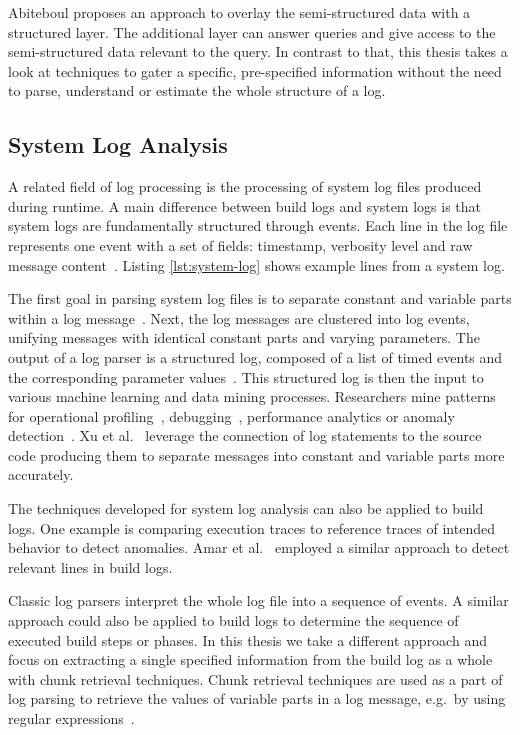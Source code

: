 \documentclass[\myrootdir/main.tex]{subfiles}
\begin{document}
Abiteboul proposes an approach to overlay the semi-structured data with a structured layer.
The additional layer can answer queries and give access to the semi-structured data relevant to the query.
In contrast to that, this thesis takes a look at techniques to gater a specific, pre-specified information without the need to parse, understand or estimate the whole structure of a log.

\subsection{System Log Analysis}
\label{sec:log-analysis}
A related field of log processing is the processing of system log files produced during runtime.
A main difference between build logs and system logs is that system logs are fundamentally structured through events.
Each line in the log file represents one event with a set of fields: timestamp, verbosity level and raw message content~\cite{he2017towards}.
Listing \ref{lst:system-log} shows example lines from a system log.

The first goal in parsing system log files is to separate constant and variable parts within a log message~\cite{nagappan2010abstracting,he2017towards}.
Next, the log messages are clustered into log events, unifying messages with identical constant parts and varying parameters.
The output of a log parser is a structured log, composed of a list of timed events and the corresponding parameter values~\cite{he2016evaluation}.
This structured log is then the input to various machine learning and data mining processes.
Researchers mine patterns for operational profiling~\cite{nagappan2009efficiently}, debugging~\cite{oliner2012advances}, performance analytics or anomaly detection~\cite{nagappan2010abstracting}.
Xu et al.~\cite{xu2009detecting} leverage the connection of log statements to the source code producing them to separate messages into constant and variable parts more accurately.

The techniques developed for system log analysis can also be applied to build logs.
One example is comparing execution traces to reference traces of intended behavior to detect anomalies.
Amar et al.~\cite{amar2019mining} employed a similar approach to detect relevant lines in build logs.

Classic log parsers interpret the whole log file into a sequence of events.
A similar approach could also be applied to build logs to determine the sequence of executed build steps or phases.
In this thesis we take a different approach and focus on extracting a single specified information from the build log as a whole with chunk retrieval techniques.
Chunk retrieval techniques are used as a part of log parsing to retrieve the values of variable parts in a log message, e.g.\ by using regular expressions~\cite{nagappan2010abstracting,xu2009detecting}.
\end{document}
